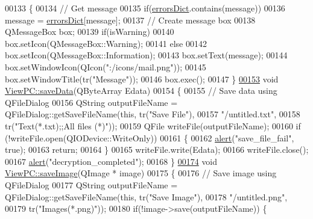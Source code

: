 \begin{DoxyCode}
00133 \{
00134     \textcolor{comment}{// Get message}
00135     \textcolor{keywordflow}{if}(\hyperlink{class_view_p_c_aaf7f058e5589d65fec72a21abfd5629b}{errorsDict}.contains(message))
00136         message = \hyperlink{class_view_p_c_aaf7f058e5589d65fec72a21abfd5629b}{errorsDict}[message];
00137     \textcolor{comment}{// Create message box}
00138     QMessageBox box;
00139     \textcolor{keywordflow}{if}(isWarning)
00140         box.setIcon(QMessageBox::Warning);
00141     \textcolor{keywordflow}{else}
00142         box.setIcon(QMessageBox::Information);
00143     box.setText(message);
00144     box.setWindowIcon(QIcon(\textcolor{stringliteral}{":/icons/mail.png"}));
00145     box.setWindowTitle(tr(\textcolor{stringliteral}{"Message"}));
00146     box.exec();
00147 \}
\hypertarget{viewpc_8cpp_source.tex_l00153}{}\hyperlink{class_view_p_c_aaff156103970be7c777beedaf0020604}{00153} \textcolor{keywordtype}{void} \hyperlink{class_view_p_c_aaff156103970be7c777beedaf0020604}{ViewPC::saveData}(QByteArray Edata)
00154 \{
00155     \textcolor{comment}{// Save data using QFileDialog}
00156     QString outputFileName = QFileDialog::getSaveFileName(\textcolor{keyword}{this}, tr(\textcolor{stringliteral}{"Save File"}),
00157                                \textcolor{stringliteral}{"/untitled.txt"},
00158                                tr(\textcolor{stringliteral}{"Text(*.txt);;All files (*)"}));
00159     QFile writeFile(outputFileName);
00160     \textcolor{keywordflow}{if} (!writeFile.open(QIODevice::WriteOnly))
00161     \{
00162         \hyperlink{class_view_p_c_a7c467169467789561078abc9d4fe57bd}{alert}(\textcolor{stringliteral}{"save\_file\_fail"}, \textcolor{keyword}{true});
00163         \textcolor{keywordflow}{return};
00164     \}
00165     writeFile.write(Edata);
00166     writeFile.close();
00167     \hyperlink{class_view_p_c_a7c467169467789561078abc9d4fe57bd}{alert}(\textcolor{stringliteral}{"decryption\_completed"});
00168 \}
\hypertarget{viewpc_8cpp_source.tex_l00174}{}\hyperlink{class_view_p_c_a7901ce10ffaaf2387bef1db7feea342d}{00174} \textcolor{keywordtype}{void} \hyperlink{class_view_p_c_a7901ce10ffaaf2387bef1db7feea342d}{ViewPC::saveImage}(QImage * image)
00175 \{
00176     \textcolor{comment}{// Save image using QFileDialog}
00177     QString outputFileName = QFileDialog::getSaveFileName(\textcolor{keyword}{this}, tr(\textcolor{stringliteral}{"Save Image"}),
00178                                \textcolor{stringliteral}{"/untitled.png"},
00179                                tr(\textcolor{stringliteral}{"Images(*.png)"}));
00180     \textcolor{keywordflow}{if}(!image->save(outputFileName)) \{

\end{DoxyCode}
